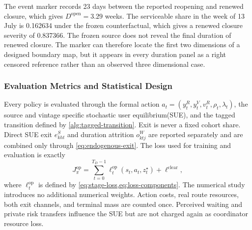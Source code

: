 \documentclass[a4paper,fleqn]{cas-sc}
\begin{document}
The event marker records 23 days between the reported reopening and renewed
closure, which gives $D^{\mathrm{open}}=3.29$ weeks. The serviceable share in
the week of 13 July is 0.162634 under the frozen counterfactual, which gives a
renewed closure severity of 0.837366. The frozen source does not reveal the final
duration of renewed closure. The marker can therefore locate the first two
dimensions of a designed boundary map, but it appears in every duration panel
as a right censored reference rather than an observed three dimensional case.

\subsubsection{Evaluation Metrics and Statistical Design}

Every policy is evaluated through the formal action
$a_t=(y_t^R,y_t^V,v_t^R,\rho_t,\lambda_t)$, the source and vintage specific
stochastic user equilibrium(SUE), and the tagged transition defined by
\cref{alg:tagged-transition}. Exit is never a fixed cohort share.
Direct SUE exit $e^S_{kht}$ and duration attrition $o^W_{ktj}$ are reported
separately and are combined only through \cref{eq:endogenous-exit}. The loss
used for training and evaluation is exactly
\begin{equation}
 J^{\mathrm{op}}_{\pi}=
 \sum_{t=0}^{T_D-1}
 \ell_t^{\mathrm{op}}(s_t,a_t,z_t^\star)
 +\ell^{\mathrm{clear}},
 \label{eq:experimental-model-loss}
\end{equation}
where $\ell_t^{\mathrm{op}}$ is defined by
\cref{eq:stage-loss,eq:loss-components}. The numerical study introduces no
additional numerical weights. Action costs, real route resources, both exit
channels, and terminal mass are counted once. Perceived waiting and private
risk transfers influence the SUE but are not charged again as coordinator
resource loss.
\end{document}
